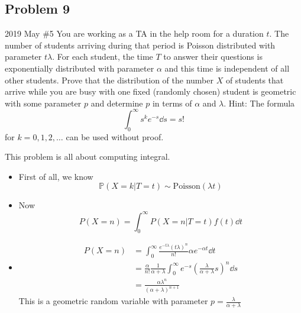 \documentclass[../main]{subfiles}
\begin{document}
\subsection{Problem 9}
\begin{bbox}{2019 May \#5}
    You are working as a TA in the help room for a duration $t$. The number of students arriving during that period is Poisson distributed with parameter $t\lambda$. For each student, the time $T$ to answer their questions is exponentially distributed with parameter $\alpha$ and this time is independent of all other students. Prove that the distribution of the number $X$ of students that arrive while you are busy with one fixed (randomly chosen) student is geometric with some parameter $p$ and determine $p$ in terms of $\alpha$ and $\lambda$.
    \newline
    Hint: The formula
    \[
    \int_{0}^\infty s^k e^{-s} \dd s = s!
    \] for $k=0,1,2,\dots$ can be used without proof.
\end{bbox}
\begin{solution}
    This problem is all about computing integral. 
    \begin{itemize}
        \item First of all, we know
        \[
        \mathbb P(X=k|T=t) \sim \text{Poisson}(\lambda t)
        \]
        \item Now
        \[
        P(X=n)=\int_{0}^\infty P(X=n|T=t)f(t) \dd t
        \]
        \item 
        \begin{align*}
            P(X=n)&=\int_{0}^\infty \frac{e^{-t\lambda}(t\lambda)^n}{n!} \alpha e^{-\alpha t} \dd t\\
            &=\frac{\alpha}{n!}\frac{1}{\alpha+\lambda}\int_{0}^\infty e^{-s}\left(\frac{\lambda}{\alpha+\lambda}s\right)^n \dd s\\
            &= \frac{\alpha \lambda^n}{(\alpha+\lambda)^{n+1}}
        \end{align*}
        This is a geometric random variable with parameter $p = \frac{\lambda}{\alpha+\lambda}$
    \end{itemize}
\end{solution}
\end{document}

